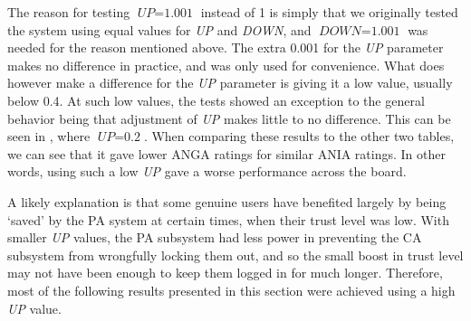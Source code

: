 The reason for testing $\textit{UP} = \text{1.001}$ instead of 1 is simply that we originally tested the system using equal values for \textit{UP} and \textit{DOWN}, and $\textit{DOWN} = \text{1.001}$ was needed for the reason mentioned above.
The extra 0.001 for the \textit{UP} parameter makes no difference in practice, and was only used for convenience.
What does however make a difference for the \textit{UP} parameter is giving it a low value, usually below 0.4.
At such low values, the tests showed an exception to the general behavior being that adjustment of \textit{UP} makes little to no difference.
This can be seen in , where $\textit{UP} = \textit{0.2}$.
When comparing these results to the other two tables, we can see that it gave lower ANGA ratings for similar ANIA ratings.
In other words, using such a low \textit{UP} gave a worse performance across the board.

A likely explanation is that some genuine users have benefited largely by being ‘saved’ by the PA system at certain times, when their trust level was low.
With smaller \textit{UP} values, the PA subsystem had less power in preventing the CA subsystem from wrongfully locking them out, and so the small boost in trust level may not have been enough to keep them logged in for much longer.
Therefore, most of the following results presented in this section were achieved using a high \textit{UP} value.


